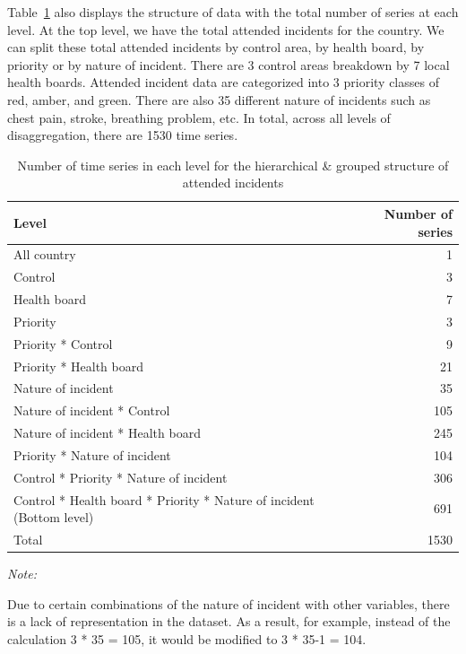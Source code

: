 \documentclass[
  authoryear,
  preprint,
  3p]{elsarticle}
\begin{document}
Table~\ref{tbl-hierarchy} also displays the structure of data with the
total number of series at each level. At the top level, we have the
total attended incidents for the country. We can split these total
attended incidents by control area, by health board, by priority or by
nature of incident. There are 3 control areas breakdown by 7 local
health boards. Attended incident data are categorized into 3 priority
classes of red, amber, and green. There are also 35 different nature of
incidents such as chest pain, stroke, breathing problem, etc. In total,
across all levels of disaggregation, there are 1530 time series.

\hypertarget{tbl-hierarchy}{}
\begin{table}
\caption{\label{tbl-hierarchy}Number of time series in each level for the hierarchical \& grouped
structure of attended incidents }\tabularnewline

\centering
\begin{threeparttable}
\begin{tabular}{lr}
\toprule
Level & Number of series\\
\midrule
All country & 1\\
Control & 3\\
Health board & 7\\
Priority & 3\\
Priority * Control & 9\\
\addlinespace
Priority * Health board & 21\\
Nature of incident & 35\\
Nature of incident * Control & 105\\
Nature of incident * Health board & 245\\
Priority * Nature of incident & 104\\
\addlinespace
Control * Priority * Nature of incident & 306\\
Control * Health board * Priority * Nature of incident (Bottom level) & 691\\
Total & 1530\\
\bottomrule
\end{tabular}
\begin{tablenotes}
\item \textit{Note: } 
\item Due to certain combinations of the nature of incident with other variables, there is a lack of representation in the dataset. As a result, for example, instead of the calculation 3 * 35 = 105, it would be modified to 3 * 35-1 = 104.
\end{tablenotes}
\end{threeparttable}
\end{table}
\end{document}
